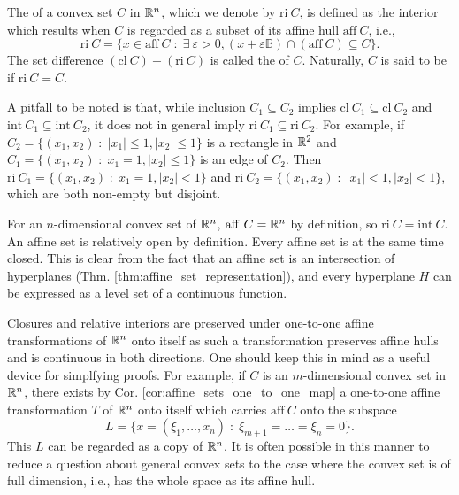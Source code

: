 \documentclass[11pt,a4paper]{article}
\begin{document}
\begin{definition}
    The  of a convex set $C$ in $\mathbb{R}^n$, which we denote by $\mathrm{ri}\ C$, is defined as the interior which results when $C$ is regarded as a subset of its affine hull $\mathrm{aff}\ C$, i.e.,
    \begin{equation*}
        \mathrm{ri}\ C = \{x\in \mathrm{aff}\ C\;:\; \exists\ \varepsilon>0, (x+\varepsilon \mathbb{B})\cap (\mathrm{aff}\ C)\subseteq C\}.
    \end{equation*}
    The set difference $(\mathrm{cl}\ C) - (\mathrm{ri}\ C)$ is called the  of $C$. Naturally, $C$ is said to be  if $\mathrm{ri}\ C = C$.
\end{definition}

\begin{remark}
    A pitfall to be noted is that, while inclusion $C_1\subseteq C_2$ implies $\mathrm{cl}\ C_1\subseteq \mathrm{cl}\ C_2$ and $\mathrm{int}\ C_1\subseteq \mathrm{int}\ C_2$, it does not in general imply $\mathrm{ri}\ C_1\subseteq \mathrm{ri}\ C_2$. For example, if $C_2 = \{(x_1,x_2)\;:\;|x_1|\le 1,|x_2|\le 1\}$ is a rectangle in $\mathbb{R}^2$ and $C_1 = \{(x_1,x_2)\;:\;x_1 = 1,|x_2|\le 1\}$ is an edge of $C_2$. Then $\mathrm{ri}\ C_1 = \{(x_1,x_2)\;:\;x_1 = 1,|x_2|< 1\}$ and $\mathrm{ri}\ C_2 = \{(x_1,x_2)\;:\;|x_1|< 1,|x_2|<1\}$, which are both non-empty but disjoint.
\end{remark}

\begin{remark}
    For an $n$-dimensional convex set of $\mathbb{R}^n$, $\mathrm{aff}\ C = \mathbb{R}^n$ by definition, so $\mathrm{ri}\ C = \mathrm{int}\ C$. An affine set is relatively open by definition. Every affine set is at the same time closed. This is clear from the fact that an affine set is an intersection of hyperplanes (Thm. \ref{thm:affine_set_representation}), and every hyperplane $H$ can be expressed as a level set of a continuous function.
\end{remark}

\begin{remark}\label{remark:simplying_ri_cl}
    Closures and relative interiors are preserved under one-to-one affine transformations of $\mathbb{R}^n$ onto itself as such a transformation preserves affine hulls and is continuous in both directions. One should keep this in mind as a useful device for simplfying proofs. For example, if $C$ is an $m$-dimensional convex set in $\mathbb{R}^n$, there exists by Cor. \ref{cor:affine_sets_one_to_one_map} a one-to-one affine transformation $T$ of $\mathbb{R}^n$ onto itself which carries $\mathrm{aff}\ C$ onto the subspace 
    \begin{equation*}
        L = \{x = (\xi_1,\ldots,x_n)\;:\;\xi_{m+1} = \ldots = \xi_{n} = 0\}.
    \end{equation*}
    This $L$ can be regarded as a copy of $\mathbb{R}^n$. It is often possible in this manner to reduce a question about general convex sets to the case where the convex set is of full dimension, i.e., has the whole space as its affine hull.
\end{remark}
\end{document}
